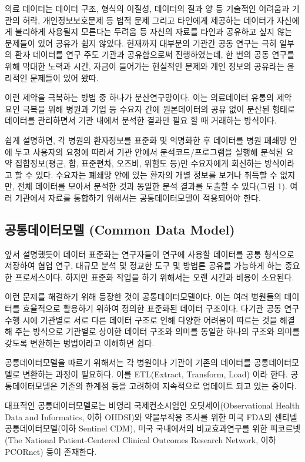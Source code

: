 \documentclass[]{book}
\begin{document}
의료 데이터는 데이터 구조, 형식의 이질성, 데이터의 질과 양 등 기술적인
어려움과 기관의 허락, 개인정보보호문제 등 법적 문제 그리고 타인에게
제공하는 데이터가 자신에게 불리하게 사용될지 모른다는 두려움 등 자신의
자료를 타인과 공유하고 싶지 않는 문제들이 있어 공유가 쉽지 않았다.
현재까지 대부분의 기관간 공동 연구는 극히 일부의 환자 데이터를 연구 주도
기관과 공유함으로써 진행하였는데, 한 번의 공동 연구를 위해 막대한 노력과
시간, 자금이 들어가는 현실적인 문제와 개인 정보의 공유라는 윤리적인
문제들이 있어 왔따.

이런 제약을 극복하는 방법 중 하나가 분산연구망이다. 이는 의료데이터
유통의 제약 요인 극복을 위해 병원과 기업 등 수요자 간에 원본데이터의
공유 없이 분산된 형태로 데이터를 관리하면서 기관 내에서 분석한 결과만
필요 할 때 거래하는 방식이다.

쉽게 설명하면, 각 병원의 환자정보를 표준화 및 익명화한 후 데이터를 병원
폐쇄망 안에 두고 사용자의 요청에 따라서 기관 안에서 분석코드/프로그램을
실행해 분석된 요약 집합정보(평균, 합, 표준편차, 오즈비, 위험도 등)만
수요자에게 회신하는 방식이라고 할 수 있다. 수요자는 폐쇄망 안에 있는
환자의 개별 정보를 보거나 취득할 수 없지만, 전체 데이터를 모아서 분석한
것과 동일한 분석 결과를 도출할 수 있다(그림 1). 여러 기관에서 자료를
통합하기 위해서는 공통데이터모델이 적용되어야 한다.

\subsection{공통데이터모델 (Common Data
Model)}\label{-common-data-model}

앞서 설명했듯이 데이터 표준화는 연구자들이 연구에 사용할 데이터를 공통
형식으로 저장하여 협업 연구, 대규모 분석 및 정교한 도구 및 방법론 공유를
가능하게 하는 중요한 프로세스이다. 하지만 표준화 작업을 하기 위해서는
오랜 시간과 비용이 소요된다.

이런 문제를 해결하기 위해 등장한 것이 공통데이터모델이다. 이는 여러
병원들의 데이터를 효율적으로 활용하기 위하여 정의한 표준화된 데이터
구조이다. 다기관 공동 연구 수행 시에 기관별로 서로 다른 데이터 구조로
인해 다양한 어려움이 따르는 것을 해결해 주는 방식으로 기관별로 상이한
데이터 구조와 의미를 동일한 하나의 구조와 의미를 갖도록 변환하는
벙법이라고 이해하면 쉽다.

공통데이터모델을 따르기 위해서는 각 병원이나 기관이 기존의 데이터를
공통데이터모델로 변환하는 과정이 필요하다. 이를 ETL(Extract, Transform,
Load) 이라 한다. 공통데이터모델은 기존의 한계점 등을 고려하여 지속적으로
업데이트 되고 있는 중이다.

대표적인 공통데이터모델로는 비영리 국제컨소시엄인 오딧세이(Observational
Health Data and Informatics, 이하 OHDSI)와 약물부작용 조사를 위한 미국
FDA의 센티넬 공통데이터모델(이하 Sentinel CDM), 미국 국내에서의
비교효과연구를 위한 피코르넷(The National Patient-Centered Clinical
Outcomes Research Network, 이하 PCORnet) 등이 존재한다.
\end{document}
